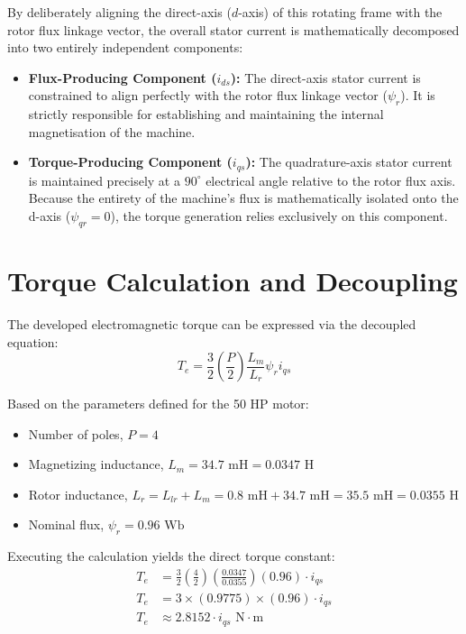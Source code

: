 \documentclass[12pt,a4paper]{report}
\begin{document}
By deliberately aligning the direct-axis ($d$-axis) of this rotating frame with the rotor flux linkage vector, the overall stator current is mathematically decomposed into two entirely independent components:
\begin{itemize}
    \item \textbf{Flux-Producing Component ($i_{ds}$):} The direct-axis stator current is constrained to align perfectly with the rotor flux linkage vector ($\psi_{r}$). It is strictly responsible for establishing and maintaining the internal magnetisation of the machine.
    \item \textbf{Torque-Producing Component ($i_{qs}$):} The quadrature-axis stator current is maintained precisely at a $90^\circ$ electrical angle relative to the rotor flux axis. Because the entirety of the machine's flux is mathematically isolated onto the d-axis ($\psi_{qr}=0$), the torque generation relies exclusively on this component.
\end{itemize}

\section{Torque Calculation and Decoupling}
The developed electromagnetic torque can be expressed via the decoupled equation:
\begin{equation}
T_{e} = \frac{3}{2} \left(\frac{P}{2}\right) \frac{L_{m}}{L_{r}} \psi_{r} i_{qs}
\end{equation}

Based on the parameters defined for the 50 HP motor:
\begin{itemize}
    \item Number of poles, $P = 4$
    \item Magnetizing inductance, $L_{m} = 34.7 \text{ mH} = 0.0347 \text{ H}$
    \item Rotor inductance, $L_{r} = L_{lr} + L_{m} = 0.8 \text{ mH} + 34.7 \text{ mH} = 35.5 \text{ mH} = 0.0355 \text{ H}$
    \item Nominal flux, $\psi_{r} = 0.96 \text{ Wb}$
\end{itemize}

Executing the calculation yields the direct torque constant:
\begin{align}
T_{e} &= \frac{3}{2} \left(\frac{4}{2}\right) \left(\frac{0.0347}{0.0355}\right) (0.96) \cdot i_{qs} \\
T_{e} &= 3 \times (0.9775) \times (0.96) \cdot i_{qs} \\
T_{e} &\approx 2.8152 \cdot i_{qs} \text{ N}\cdot\text{m}
\end{align}
\end{document}
